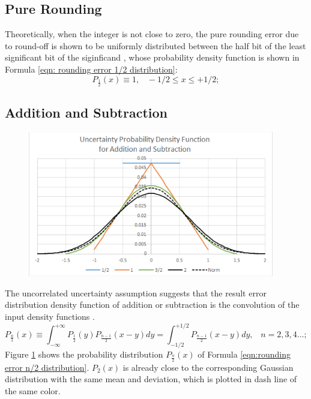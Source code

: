 \documentclass[twoside]{article}
\numberwithin{equation}{section}
\newcommand{\eqspace}{\;\;\;}
\begin{document}
\subsection{Pure Rounding}

Theoretically, when the integer is not close to zero, the pure rounding error due to round-off is shown to be uniformly distributed between the half bit of the least significant bit of the siginficand \cite{Prev_Precision_Arithmetic}, whose probability density function is shown in Formula \eqref{eqn: rounding error 1/2 distribution}:
\begin{equation}
\label{eqn: rounding error 1/2 distribution}
P_{\frac{1}{2}}(x) \equiv 1, \eqspace  -1/2 \leq x \leq +1/2; 
\end{equation}



\subsection{Addition and Subtraction  \cite{Prev_Precision_Arithmetic}}

\begin{figure}
\centering
\includegraphics[height=2.5in]{Prec_Add_ErrDist.pdf}
\label{fig: Prec_Add_Err_Dist}
\end{figure}


The uncorrelated uncertainty assumption suggests that the result error distribution density function of addition or subtraction is the convolution of the input density functions \cite{Probability_Statistics}.  
\begin{equation}
\label{eqn:rounding error n/2 distribution}
P_{\frac{n}{2}}(x) \equiv \int _{-\infty}^{+\infty}P_{\frac{1}{2}}(y)P_{\frac{n-1}{2}}(x-y)dy=\int _{-1/2}^{+1/2}P_{\frac{n-1}{2}}(x-y) dy,\eqspace n=2,3,4\dots;
\end{equation}
Figure \ref{fig: Prec_Add_Err_Dist} shows the probability distribution $P_{\frac{n}{2}}(x)$ of Formula \eqref{eqn:rounding error n/2 distribution}.  
$P_{2}(x)$ is already close to the corresponding Gaussian distribution with the same mean and deviation, which is plotted in dash line of the same color.
\end{document}
